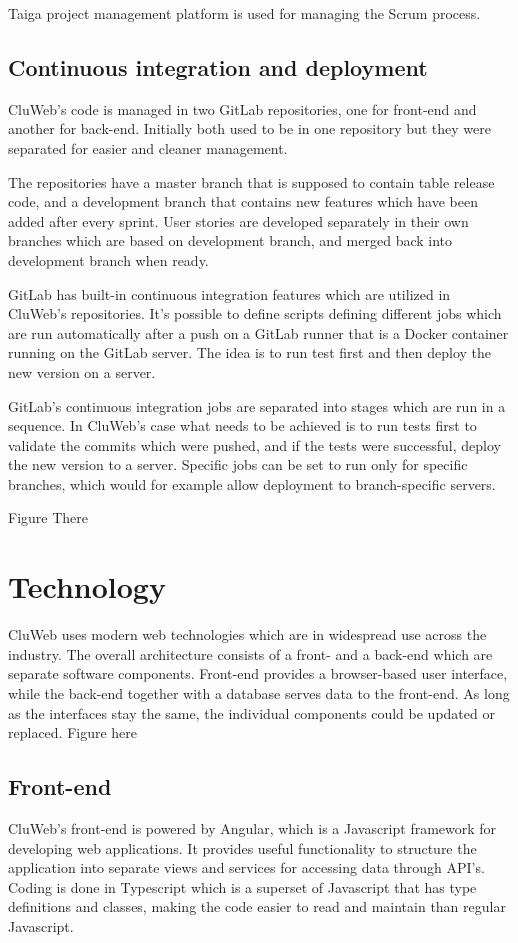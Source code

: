 Taiga project management platform is used for managing the Scrum process.

\subsection{Continuous integration and deployment}
CluWeb's code is managed in two GitLab repositories, one for front-end and another for back-end. Initially both used to be in one repository but they were separated for easier and cleaner management.

The repositories have a master branch that is supposed to contain table release code, and a development branch that contains new features which have been added after every sprint. User stories are developed separately in their own branches which are based on development branch, and merged back into development branch when ready.

GitLab has built-in continuous integration features which are utilized in CluWeb's repositories. It's possible to define scripts defining different jobs which are run automatically after a push on a GitLab runner that is a Docker container running on the GitLab server. The idea is to run test first and then deploy the new version on a server.

GitLab's continuous integration jobs are separated into stages which are run in a sequence. In CluWeb's case what needs to be achieved is to run tests first to validate the commits which were pushed, and if the tests were successful, deploy the new version to a server. Specific jobs can be set to run only for specific branches, which would for example allow deployment to branch-specific servers.

Figure There

\section{Technology}
CluWeb uses modern web technologies which are in widespread use across the industry. The overall architecture consists of a front- and a back-end which are separate software components. Front-end provides a browser-based user interface, while the back-end together with a database serves data to the front-end. As long as the interfaces stay the same, the individual components could be updated or replaced.
Figure here
\subsection{Front-end}
CluWeb's front-end is powered by Angular, which is a Javascript framework for developing web applications. It provides useful functionality to structure the application into separate views and services for accessing data through API's. Coding is done in Typescript which is a superset of Javascript that has type definitions and classes, making the code easier to read and maintain than regular Javascript.


